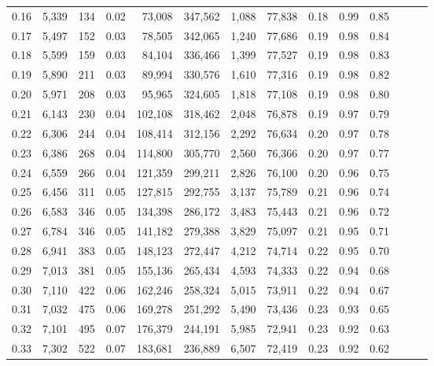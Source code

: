 \begin{tabular}{rrrrrrrrrrrrrr}
0.16 &   5,339 &    134 &  0.02 &   73,008 &  347,562 &   1,088 &  77,838 &  0.18 &  0.99 &      0.85 \\
0.17 &   5,497 &    152 &  0.03 &   78,505 &  342,065 &   1,240 &  77,686 &  0.19 &  0.98 &      0.84 \\
0.18 &   5,599 &    159 &  0.03 &   84,104 &  336,466 &   1,399 &  77,527 &  0.19 &  0.98 &      0.83 \\
0.19 &   5,890 &    211 &  0.03 &   89,994 &  330,576 &   1,610 &  77,316 &  0.19 &  0.98 &      0.82 \\
0.20 &   5,971 &    208 &  0.03 &   95,965 &  324,605 &   1,818 &  77,108 &  0.19 &  0.98 &      0.80 \\
0.21 &   6,143 &    230 &  0.04 &  102,108 &  318,462 &   2,048 &  76,878 &  0.19 &  0.97 &      0.79 \\
0.22 &   6,306 &    244 &  0.04 &  108,414 &  312,156 &   2,292 &  76,634 &  0.20 &  0.97 &      0.78 \\
0.23 &   6,386 &    268 &  0.04 &  114,800 &  305,770 &   2,560 &  76,366 &  0.20 &  0.97 &      0.77 \\
0.24 &   6,559 &    266 &  0.04 &  121,359 &  299,211 &   2,826 &  76,100 &  0.20 &  0.96 &      0.75 \\
0.25 &   6,456 &    311 &  0.05 &  127,815 &  292,755 &   3,137 &  75,789 &  0.21 &  0.96 &      0.74 \\
0.26 &   6,583 &    346 &  0.05 &  134,398 &  286,172 &   3,483 &  75,443 &  0.21 &  0.96 &      0.72 \\
0.27 &   6,784 &    346 &  0.05 &  141,182 &  279,388 &   3,829 &  75,097 &  0.21 &  0.95 &      0.71 \\
0.28 &   6,941 &    383 &  0.05 &  148,123 &  272,447 &   4,212 &  74,714 &  0.22 &  0.95 &      0.70 \\
0.29 &   7,013 &    381 &  0.05 &  155,136 &  265,434 &   4,593 &  74,333 &  0.22 &  0.94 &      0.68 \\
0.30 &   7,110 &    422 &  0.06 &  162,246 &  258,324 &   5,015 &  73,911 &  0.22 &  0.94 &      0.67 \\
0.31 &   7,032 &    475 &  0.06 &  169,278 &  251,292 &   5,490 &  73,436 &  0.23 &  0.93 &      0.65 \\
0.32 &   7,101 &    495 &  0.07 &  176,379 &  244,191 &   5,985 &  72,941 &  0.23 &  0.92 &      0.63 \\
0.33 &   7,302 &    522 &  0.07 &  183,681 &  236,889 &   6,507 &  72,419 &  0.23 &  0.92 &      0.62 \\

\end{tabular}

